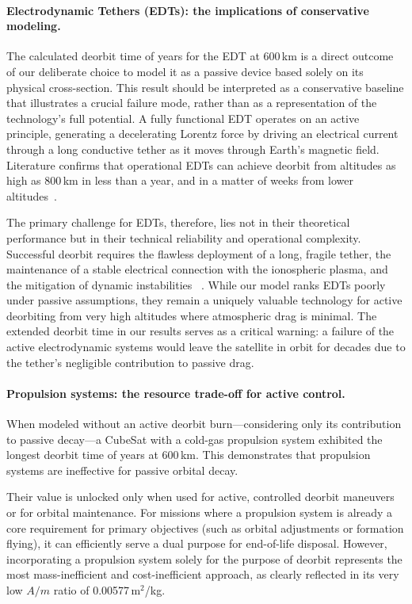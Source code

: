 \documentclass[11pt,a4paper]{article}
\begin{document}
\paragraph{Electrodynamic Tethers (EDTs): the implications of conservative modeling.} The calculated deorbit time of \EDTSix{} years for the EDT at 600\,km is a direct outcome of our deliberate choice to model it as a passive device based solely on its physical cross-section. This result should be interpreted as a conservative baseline that illustrates a crucial failure mode, rather than as a representation of the technology's full potential. A fully functional EDT operates on an active principle, generating a decelerating Lorentz force by driving an electrical current through a long conductive tether as it moves through Earth's magnetic field. Literature confirms that operational EDTs can achieve deorbit from altitudes as high as 800\,km in less than a year, and in a matter of weeks from lower altitudes~\cite{bilen,sarego,nasa2021}.

The primary challenge for EDTs, therefore, lies not in their theoretical performance but in their technical reliability and operational complexity. Successful deorbit requires the flawless deployment of a long, fragile tether, the maintenance of a stable electrical connection with the ionospheric plasma, and the mitigation of dynamic instabilities ~\cite{sanchez,nasa2021}. While our model ranks EDTs poorly under passive assumptions, they remain a uniquely valuable technology for active deorbiting from very high altitudes where atmospheric drag is minimal. The extended deorbit time in our results serves as a critical warning: a failure of the active electrodynamic systems would leave the satellite in orbit for decades due to the tether's negligible contribution to passive drag.

\paragraph{Propulsion systems: the resource trade-off for active control.} When modeled without an active deorbit burn---considering only its contribution to passive decay---a CubeSat with a cold-gas propulsion system exhibited the longest deorbit time of \PropSix{} years at 600\,km. This demonstrates that propulsion systems are ineffective for passive orbital decay.

Their value is unlocked only when used for active, controlled deorbit maneuvers or for orbital maintenance. For missions where a propulsion system is already a core requirement for primary objectives (such as orbital adjustments or formation flying), it can efficiently serve a dual purpose for end-of-life disposal. However, incorporating a propulsion system solely for the purpose of deorbit represents the most mass-inefficient and cost-inefficient approach, as clearly reflected in its very low $A/m$ ratio of 0.00577\,m$^2$/kg.
\end{document}
